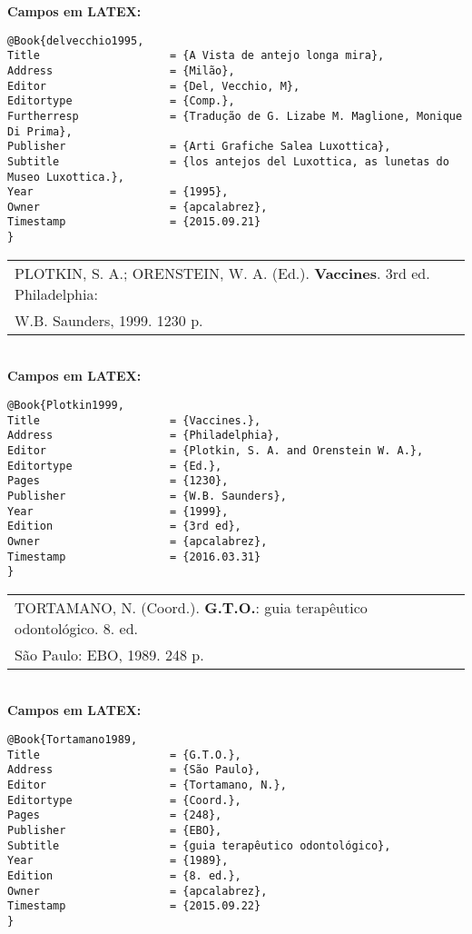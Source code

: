 \textbf{Campos em LATEX:}

\begin{verbatim}
@Book{delvecchio1995,
Title                    = {A Vista de antejo longa mira},
Address                  = {Milão},
Editor                   = {Del, Vecchio, M},
Editortype               = {Comp.},
Furtherresp              = {Tradução de G. Lizabe M. Maglione, Monique 
Di Prima},
Publisher                = {Arti Grafiche Salea Luxottica},
Subtitle                 = {los antejos del Luxottica, as lunetas do 
Museo Luxottica.},
Year                     = {1995},
Owner                    = {apcalabrez},
Timestamp                = {2015.09.21}
}
\end{verbatim}

\begin{tabular}{|l|c|} \hline
PLOTKIN, S. A.; ORENSTEIN, W. A. (Ed.). \textbf{Vaccines}. 3rd ed. Philadelphia: \\ W.B. Saunders, 1999. 1230 p.  \\\hline
\end{tabular}\\

\textbf{Campos em LATEX:}

\begin{verbatim}
@Book{Plotkin1999,
Title                    = {Vaccines.},
Address                  = {Philadelphia},
Editor                   = {Plotkin, S. A. and Orenstein W. A.},
Editortype               = {Ed.},
Pages                    = {1230},
Publisher                = {W.B. Saunders},
Year                     = {1999},
Edition                  = {3rd ed},
Owner                    = {apcalabrez},
Timestamp                = {2016.03.31}
}
\end{verbatim}

\begin{tabular}{|l|c|} \hline
TORTAMANO, N. (Coord.). \textbf{G.T.O.}: guia terapêutico odontológico. 8. ed. \\São  Paulo: EBO, 1989. 248 p.  \\\hline
\end{tabular}\\

\textbf{Campos em LATEX:}

\begin{verbatim}
@Book{Tortamano1989,
Title                    = {G.T.O.},
Address                  = {São Paulo},
Editor                   = {Tortamano, N.},
Editortype               = {Coord.},
Pages                    = {248},
Publisher                = {EBO},
Subtitle                 = {guia terapêutico odontológico},
Year                     = {1989},
Edition                  = {8. ed.},
Owner                    = {apcalabrez},
Timestamp                = {2015.09.22}
}
\end{verbatim}

